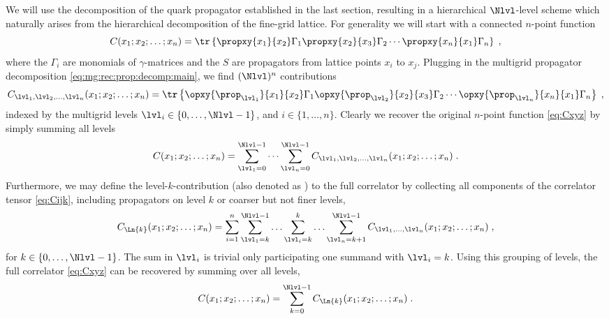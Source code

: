 We will use the decomposition of the quark propagator established in the last section, resulting in a hierarchical $\Nlvl$-level scheme which naturally arises from the hierarchical decomposition of the fine-grid lattice.
For generality we will start with a connected $n$-point function
\begin{equation} \label{eq:Cxyz}
C(x_1;x_2;\ldots;x_n) = \tr \left\{
\propxy{x_1}{x_2}
\Gamma_1
\propxy{x_2}{x_3}
\Gamma_2
\cdots
\propxy{x_n}{x_1}
\Gamma_n
\right\} \;,
\end{equation}
where the $\Gamma_i$ are monomials of $\gamma$-matrices and the $S$ are propagators from lattice points $x_i$ to $x_j$.
Plugging in the multigrid propagator decomposition \cref{eq:mg:rec:prop:decomp:main}, we find $(\Nlvl)^{n}$ contributions
\begin{equation} \label{eq:Cijk}
C_{\lvl_1, \lvl_2, \ldots, \lvl_n}(x_1;x_2;\ldots;x_n)
= \tr \left\{
\opxy{\prop_{\lvl_1}}{x_1}{x_2}
\Gamma_1
\opxy{\prop_{\lvl_2}}{x_2}{x_3}
\Gamma_2
\cdots
\opxy{\prop_{\lvl_n}}{x_n}{x_1}
\Gamma_n
\right\} \;,
\end{equation}
indexed by the multigrid levels $\lvl_i \in \{0, \ldots, \Nlvl-1\}$, and $i \in \{1, \ldots, n\}$.
Clearly we recover the original $n$-point function \cref{eq:Cxyz} by simply summing all levels
\begin{equation}
C(x_1;x_2;\ldots;x_n)
= \sum_{\lvl_1=0}^{\Nlvl-1} \cdots \sum_{\lvl_n=0}^{\Nlvl-1}
C_{\lvl_1, \lvl_2, \ldots, \lvl_n}(x_1;x_2;\ldots;x_n) \;.
\end{equation}
Furthermore, we may define the level-$k$-contribution (also denoted as ) to the full correlator by collecting all components of the correlator tensor \cref{eq:Cijk}, including propagators on level $k$ or coarser but not finer levels, \ie
\begin{align}
C_{\Ln{k}}(x_1;x_2;\ldots;x_n)
= \sum_{i=1}^{n}
  \sum_{\lvl_1=k}^{\Nlvl-1}
  \ldots
  \sum_{\lvl_i=k}^{k}
  \ldots
  \sum_{\lvl_n=k+1}^{\Nlvl-1}
  C_{\lvl_1, \ldots, \lvl_n}(x_1;x_2;\ldots;x_n) \;,
\end{align}
for $k \in \{0, \ldots, \Nlvl-1\}$.
The sum in $\lvl_i$ is trivial only participating one summand with $\lvl_i=k$.
Using this grouping of levels, the full correlator \cref{eq:Cxyz} can be recovered by summing over all levels,
\begin{align}
C(x_1;x_2;\ldots;x_n) = \sum_{k=0}^{\Nlvl-1} C_{\Ln{k}}(x_1;x_2;\ldots;x_n) \;.
\end{align}
